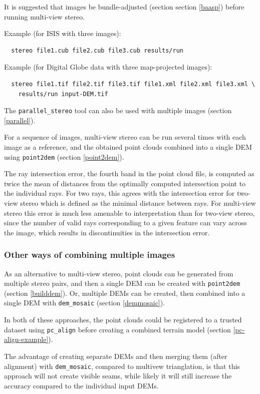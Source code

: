 It is suggested that images be bundle-adjusted (section section
\ref{baasp}) before running multi-view stereo.

Example (for ISIS with three images):
\begin{verbatim}
  stereo file1.cub file2.cub file3.cub results/run
\end{verbatim}

Example (for Digital Globe data with three map-projected images):
\begin{verbatim}
  stereo file1.tif file2.tif file3.tif file1.xml file2.xml file3.xml \
    results/run input-DEM.tif
\end{verbatim}

The \texttt{parallel\_stereo} tool can also be used with multiple images
(section \ref{parallel}).

For a sequence of images, multi-view stereo can be run several times
with each image as a reference, and the obtained point clouds combined
into a single DEM using \texttt{point2dem} (section \ref{point2dem}).

The ray intersection error, the fourth band in the point cloud
file, is computed as twice the mean of distances from the optimally
computed intersection point to the individual rays. For two rays, this
agrees with the intersection error for two-view stereo which is defined
as the minimal distance between rays. For multi-view stereo this error
is much less amenable to interpretation than for two-view stereo, since the
number of valid rays corresponding to a given feature can vary across
the image, which results in discontinuities in the intersection error.

\subsubsection*{Other ways of combining multiple images}

As an alternative to multi-view stereo, point clouds can be generated
from multiple stereo pairs, and then a single DEM can be created with
\texttt{point2dem} (section \ref{builddem}). Or, multiple DEMs
can be created, then combined into a single DEM with \texttt{dem\_mosaic}
(section \ref{demmosaic}).

In both of these approaches, the point clouds could be registered
to a trusted dataset using \texttt{pc\_align} before creating a combined
terrain model (section \ref{pc-align-example}).

The advantage of creating separate DEMs and then merging them (after
alignment) with \texttt{dem\_mosaic}, compared to multivew trianglation,
is that this approach will not create visible seams, while likely it will
still increase the accuracy compared to the individual input DEMs.

